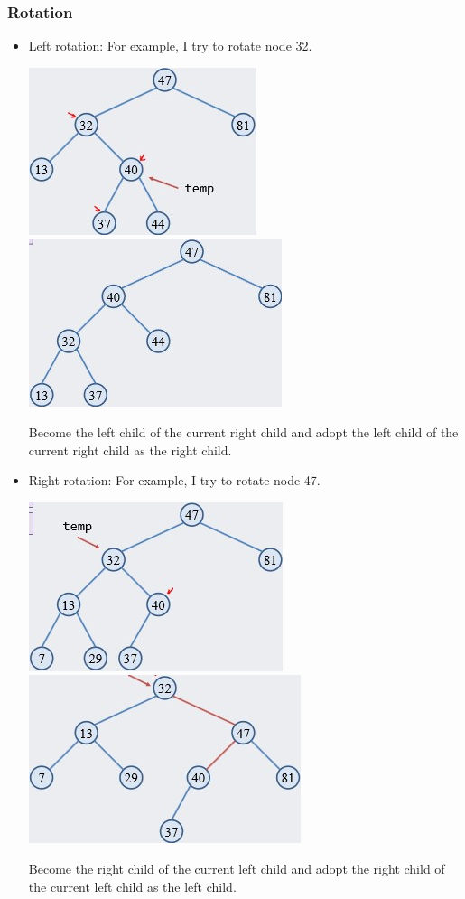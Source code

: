 \documentclass[letterpaper,12pt]{article}
\begin{document}
\subsubsection{Rotation}
\begin{itemize}
    \item Left rotation: For example, I try to rotate node 32. 
    
    \includegraphics*[scale = 0.8]{./Images/Left Rotation Before.jpg}
    \includegraphics*[scale = 0.8]{./Images/Left Rotation After.jpg}

    Become the left child of the current right child and adopt the left child of the current right child as the right child.
    \item Right rotation: For example, I try to rotate node 47.
    
    \includegraphics*[scale = 0.8]{./Images/Right Rotation Before.jpg}
    \includegraphics*[scale = 0.8]{./Images/Right Rotation After.jpg}

    Become the right child of the current left child and adopt the right child of the current left child as the left child.
\end{itemize}
\end{document}
